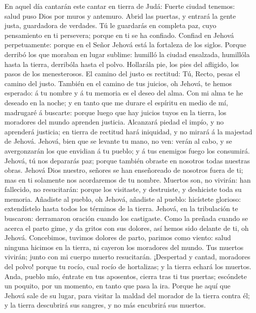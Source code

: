  En aquel día cantarán este cantar en tierra de Judá:
Fuerte ciudad tenemos: salud puso Dios por muros y antemuro.
 Abrid las puertas, y entrará la gente justa, guardadora
de verdades.  Tú le guardarás en completa paz, cuyo
pensamiento en ti persevera; porque en ti se ha confiado. 
Confiad en Jehová perpetuamente: porque en el Señor Jehová está la
fortaleza de los siglos.  Porque derribó los que moraban
en lugar sublime: humilló la ciudad ensalzada, humillóla hasta la
tierra, derribóla hasta el polvo.  Hollarála pie, los pies
del afligido, los pasos de los menesterosos.  El camino
del justo es rectitud: Tú, Recto, pesas el camino del justo.
 También en el camino de tus juicios, oh Jehová, te hemos
esperado: á tu nombre y á tu memoria es el deseo del alma.
 Con mi alma te he deseado en la noche; y en tanto que me
durare el espíritu en medio de mí, madrugaré á buscarte: porque luego
que hay juicios tuyos en la tierra, los moradores del mundo aprenden
justicia.  Alcanzará piedad el impío, y no aprenderá
justicia; en tierra de rectitud hará iniquidad, y no mirará á la
majestad de Jehová.  Jehová, bien que se levante tu mano,
no ven: verán al cabo, y se avergonzarán los que envidian á tu pueblo; y
á tus enemigos fuego los consumirá.  Jehová, tú nos
depararás paz; porque también obraste en nosotros todas nuestras obras.
 Jehová Dios nuestro, señores se han enseñoreado de
nosotros fuera de ti; mas en ti solamente nos acordaremos de tu nombre.
 Muertos son, no vivirán: han fallecido, no resucitarán:
porque los visitaste, y destruiste, y deshiciste toda su memoria.
 Añadiste al pueblo, oh Jehová, añadiste al pueblo:
hicístete glorioso: extendístelo hasta todos los términos de la tierra.
 Jehová, en la tribulación te buscaron: derramaron
oración cuando los castigaste.  Como la preñada cuando se
acerca el parto gime, y da gritos con sus dolores, así hemos sido
delante de ti, oh Jehová.  Concebimos, tuvimos dolores de
parto, parimos como viento: salud ninguna hicimos en la tierra, ni
cayeron los moradores del mundo.  Tus muertos vivirán;
junto con mi cuerpo muerto resucitarán. ¡Despertad y cantad, moradores
del polvo! porque tu rocío, cual rocío de hortalizas; y la tierra echará
los muertos.  Anda, pueblo mío, éntrate en tus aposentos,
cierra tras ti tus puertas; escóndete un poquito, por un momento, en
tanto que pasa la ira.  Porque he aquí que Jehová sale de
su lugar, para visitar la maldad del morador de la tierra contra él; y
la tierra descubrirá sus sangres, y no más encubrirá sus muertos.

